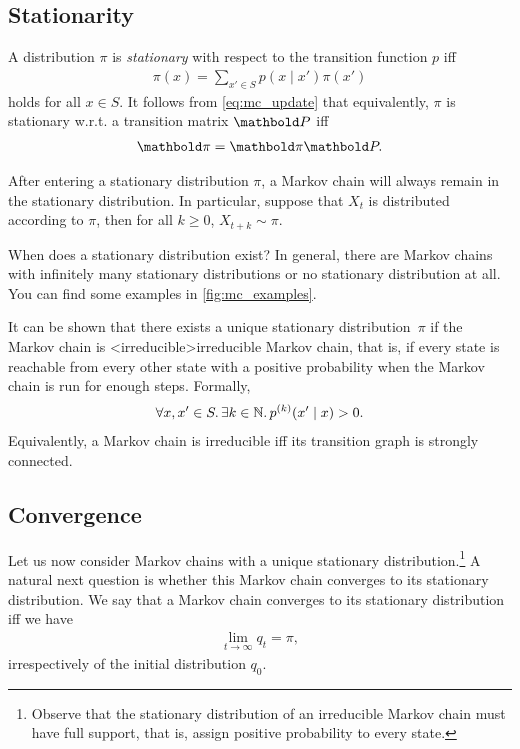 \subsection{Stationarity}

\begin{defn}
  A distribution $\pi$ is \emph{stationary} with respect to the transition function $p$ iff \begin{align}
    \pi(x) = \sum_{x' \in S} p(x \mid x') \pi(x')
  \end{align} holds for all $x \in S$.
  It follows from \cref{eq:mc_update} that equivalently, $\pi$ is stationary w.r.t. a transition matrix $\mP$ iff \begin{align}
    \vpi = \vpi \mP. \label{eq:stationarity_vector_form}
  \end{align}
\end{defn}

After entering a stationary distribution $\pi$, a Markov chain will always remain in the stationary distribution.
In particular, suppose that $X_t$ is distributed according to $\pi$, then for all $k \geq 0$, $X_{t+k} \sim \pi$.

\begin{rmk}{When does a stationary distribution exist?}{}
  In general, there are Markov chains with infinitely many stationary distributions or no stationary distribution at all.
  You can find some examples in \cref{fig:mc_examples}.

  It can be shown that there exists a unique stationary distribution~$\pi$ if the Markov chain is \midx<irreducible>{irreducible Markov chain}, that is, if every state is reachable from every other state with a positive probability when the Markov chain is run for enough steps. Formally, \begin{align}
    \forall x,x' \in S. \, \exists k \in \mathbb{N}. \, p^{(k)}(x' \mid x) > 0.
  \end{align}
  Equivalently, a Markov chain is irreducible iff its transition graph is strongly connected.
\end{rmk}

\subsection{Convergence}\label{sec:mcmc:mc:convergence}

Let us now consider Markov chains with a unique stationary distribution.\footnote{Observe that the stationary distribution of an irreducible Markov chain must have full support, that is, assign positive probability to every state.}
A natural next question is whether this Markov chain converges to its stationary distribution.
We say that a Markov chain converges to its stationary distribution iff we have \begin{align}
  \lim_{t\to\infty} q_{t} = \pi,
\end{align} irrespectively of the initial distribution $q_0$.


